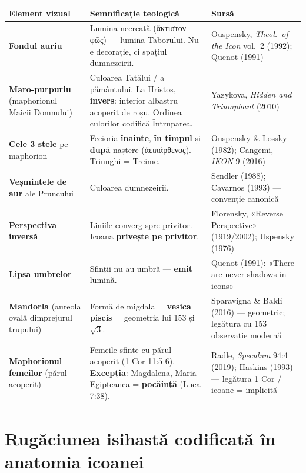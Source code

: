 \documentclass[12pt,a4paper,twoside,openany]{book}
\begin{document}
\begin{center}
\footnotesize
\begin{tabular}{L{2.5cm}L{6cm}L{3.5cm}}
\toprule
{}
\textbf{Element vizual} & \textbf{Semnificație teologică} & \textbf{Sursă} \\
\midrule
\textbf{Fondul auriu} & Lumina necreată (ἄκτιστον φῶς) --- lumina Taborului. Nu e decorație, ci spațiul dumnezeirii. & Ouspensky, \textit{Theol.\ of the Icon} vol.\ 2 (1992); Quenot (1991) \\
\textbf{Maro-purpuriu} (maphorionul Maicii Domnului) & Culoarea Tatălui / a pământului. La Hristos, \textbf{invers}: interior albastru acoperit de roșu. Ordinea culorilor codifică Întruparea. & Yazykova, \textit{Hidden and Triumphant} (2010) \\
\textbf{Cele 3 stele} pe maphorion & Fecioria \textbf{înainte}, \textbf{în timpul} și \textbf{după} naștere (ἀειπάρθενος). Triunghi = Treime. & Ouspensky \& Lossky (1982); Cangemi, \textit{IKON} 9 (2016) \\
\textbf{Veșmintele de aur} ale Pruncului & Culoarea dumnezeirii. & Sendler (1988); Cavarnos (1993) --- convenție canonică \\
\textbf{Perspectiva inversă} & Liniile converg spre privitor. Icoana \textbf{privește pe privitor}. & Florensky, «Reverse Perspective» (1919/2002); Uspensky (1976) \\
\textbf{Lipsa umbrelor} & Sfinții nu au umbră --- \textbf{emit} lumină. & Quenot (1991): «There are never shadows in icons» \\
\textbf{Mandorla} (aureola ovală dimprejurul trupului) & Formă de migdală = \textbf{vesica piscis} = geometria lui 153 și $\sqrt{3}$. & Sparavigna \& Baldi (2016) --- geometric; legătura cu 153 = observație modernă \\
\textbf{Maphorionul femeilor} (părul acoperit) & Femeile sfinte cu părul acoperit (1 Cor 11:5-6). \textbf{Excepția}: Magdalena, Maria Egipteanca = \textbf{pocăință} (Luca 7:38). & Radle, \textit{Speculum} 94:4 (2019); Haskins (1993) --- legătura 1 Cor / icoane = implicită \\
\bottomrule
\end{tabular}
\end{center}

\section*{Rugăciunea isihastă codificată în anatomia icoanei}
\end{document}
